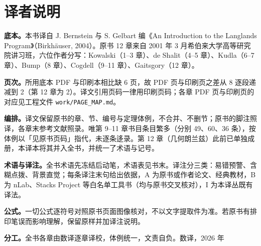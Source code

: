 \chapter*{译者说明}

\textbf{底本。}本书译自 J. Bernstein 与 S. Gelbart 编《An Introduction to the Langlands Program》（Birkhäuser, 2004）。原书 12 章来自 2001 年 3 月希伯来大学高等研究院讲习班，六位作者分写：Kowalski（1–3 章）、de Shalit（4–5 章）、Kudla（6–7 章）、Bump（8 章）、Cogdell（9–11 章）、Gaitsgory（12 章）。

\textbf{页次。}所用底本 PDF 与印刷本相比缺 6 页，故 PDF 页与印刷页之差从 8 逐段递减到 2（第 12 章为 2）。译文引用页码一律用印刷页码；各章 PDF 页与印刷页的对应见工程文件 \texttt{work/PAGE\_MAP.md}。

\textbf{编排。}译文保留原书的章、节、编号与定理体例，不合并、不删节；原书的脚注照译，各章末参考文献照录。唯第 9--11 章书目条目繁多（分别 49、60、36 条），按体例以「见原书页码」指代，未逐条迻录。第 12 章（几何朗兰兹）此前已单独成册，本译本将其并入全书，并统一了术语与记号。

\textbf{术语与译注。}全书术语先冻结后动笔，术语表见书末。译注分三类：易错预警、含糊点拨、背景直觉；每条译注末句给出依据，A 为原书或作者论文、经典教材，B 为 nLab、Stacks Project 等白名单工具书（均与原书交叉核对），I 为本译丛既有译法。

\textbf{公式。}一切公式逐符号对照原书页面图像核对，不以文字提取件为准。若原书有排印笔误而影响理解，保留原样并加译注说明。

\textbf{分工。}全书各章由数译逐章译校，体例统一，文责自负。\hfill 数译，2026 年
